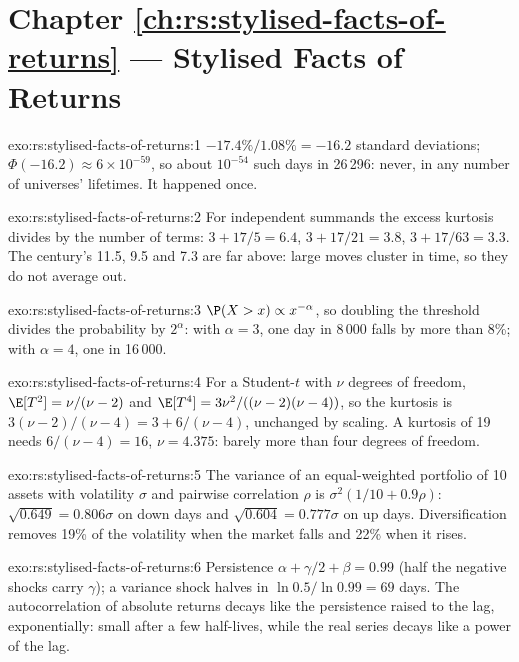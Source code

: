 \section*{Chapter \ref{ch:rs:stylised-facts-of-returns} --- Stylised Facts of Returns}

\begin{solution}{exo:rs:stylised-facts-of-returns:1}
$-17.4\%/1.08\% = -16.2$ standard deviations; $\Phi(-16.2) \approx 6 \times 10^{-59}$, so about $10^{-54}$ such days in 26\,296: never, in
any number of universes' lifetimes. It happened once.
\end{solution}

\begin{solution}{exo:rs:stylised-facts-of-returns:2}
For independent summands the excess kurtosis divides by the number of terms: $3 + 17/5 = 6.4$, $3 + 17/21 = 3.8$, $3 + 17/63 = 3.3$.
The century's 11.5, 9.5 and 7.3 are far above: large moves cluster in time, so they do not average out.
\end{solution}

\begin{solution}{exo:rs:stylised-facts-of-returns:3}
$\P(X > x) \propto x^{-\alpha}$, so doubling the threshold divides the probability by $2^\alpha$: with $\alpha = 3$, one day in 8\,000 falls by
more than 8\%; with $\alpha = 4$, one in 16\,000.
\end{solution}

\begin{solution}{exo:rs:stylised-facts-of-returns:4}
For a Student-$t$ with $\nu$ degrees of freedom, $\E[T^2] = \nu/(\nu - 2)$ and $\E[T^4] = 3\nu^2/((\nu - 2)(\nu - 4))$, so the kurtosis is
$3(\nu - 2)/(\nu - 4) = 3 + 6/(\nu - 4)$, unchanged by scaling. A kurtosis of 19 needs $6/(\nu - 4) = 16$, $\nu = 4.375$: barely more than
four degrees of freedom.
\end{solution}

\begin{solution}{exo:rs:stylised-facts-of-returns:5}
The variance of an equal-weighted portfolio of 10 assets with volatility $\sigma$ and pairwise correlation $\rho$ is $\sigma^2(1/10 +
0.9\rho)$: $\sqrt{0.649} = 0.806\sigma$ on down days and $\sqrt{0.604} = 0.777\sigma$ on up days. Diversification removes 19\% of the
volatility when the market falls and 22\% when it rises.
\end{solution}

\begin{solution}{exo:rs:stylised-facts-of-returns:6}
Persistence $\alpha + \gamma/2 + \beta = 0.99$ (half the negative shocks carry $\gamma$); a variance shock halves in $\ln 0.5/\ln 0.99 = 69$
days. The autocorrelation of absolute returns decays like the persistence raised to the lag, exponentially: small after a few
half-lives, while the real series decays like a power of the lag.
\end{solution}

